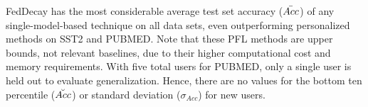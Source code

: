 \begin{table}[htbp]
{        FedDecay has the most considerable average test set accuracy ($\Bar{Acc}$) of any single-model-based technique on all data sets, even outperforming personalized methods on SST2 and PUBMED. 
        Note that these PFL methods are upper bounds, not relevant baselines, due to their higher computational cost and memory requirements.
        With five total users for PUBMED, only a single user is held out to evaluate generalization.
        Hence, there are no values for the bottom ten percentile ($\Breve{Acc}$) or standard deviation ($\sigma_{Acc}$) for new users.
    }
    \label{tab: metrics--unseen}
\end{table}
